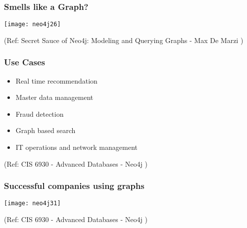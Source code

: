 \begin{frame}[fragile]\frametitle{Smells like a Graph?}

\begin{center}
\texttt{[image: neo4j26]}
\end{center}	    

{\tiny (Ref: Secret Sauce of Neo4j: Modeling and Querying Graphs
 - Max De Marzi )}

\end{frame}

\begin{frame}\frametitle{Use Cases}


\begin{itemize}
\item  Real time recommendation
\item  Master data management 
\item  Fraud detection
\item  Graph based search 
\item  IT operations and network management 
\end{itemize}


{\tiny (Ref: CIS 6930 - Advanced Databases - Neo4j )}
\end{frame}

\begin{frame}\frametitle{Successful companies using graphs}


\begin{center}
\texttt{[image: neo4j31]}
\end{center}	

{\tiny (Ref: CIS 6930 - Advanced Databases - Neo4j )}
\end{frame}

